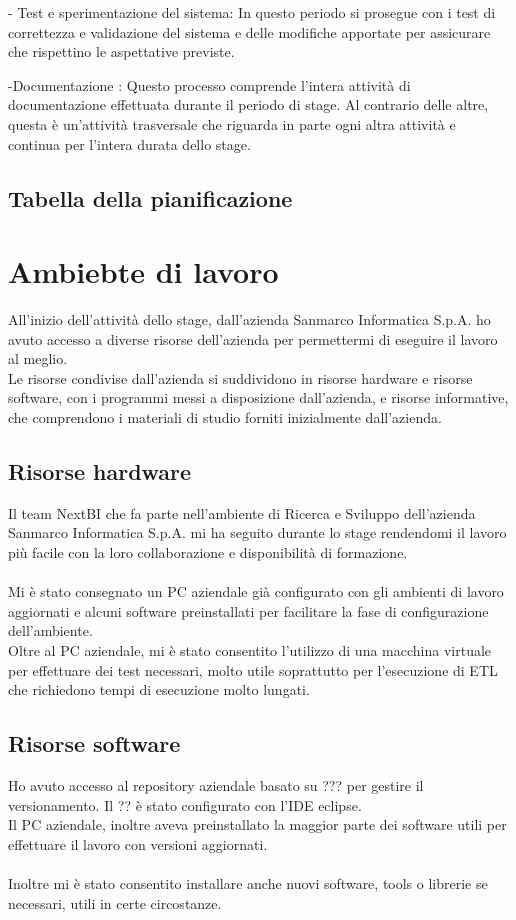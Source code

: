 - Test e sperimentazione del sistema:
In questo periodo si prosegue con i test di correttezza e validazione del sistema e delle modifiche apportate per assicurare che rispettino le aspettative previste.

-Documentazione : 
Questo  processo comprende l’intera attività di documentazione effettuata durante il periodo di stage. Al contrario delle altre, questa è un’attività trasversale che riguarda in parte ogni altra attività e continua per l’intera durata dello stage.


\subsection{Tabella della pianificazione}

\section{Ambiebte di lavoro}

All’inizio dell’attività dello stage, dall’azienda Sanmarco Informatica S.p.A. ho avuto accesso a diverse risorse dell’azienda per permettermi di eseguire il lavoro al meglio. \\
Le risorse condivise dall'azienda si suddividono in risorse hardware e risorse software, con i programmi messi a disposizione dall’azienda, e risorse informative, che comprendono i materiali di studio forniti inizialmente dall’azienda. 

\subsection{Risorse hardware}

Il team NextBI che fa parte nell’ambiente di Ricerca e Sviluppo dell'azienda Sanmarco Informatica S.p.A. mi ha seguito durante lo stage rendendomi il lavoro più facile con la loro collaborazione e disponibilità di formazione. \\\\

Mi è stato consegnato un PC aziendale già configurato con gli ambienti di lavoro aggiornati e alcuni software preinstallati per facilitare la fase di configurazione dell’ambiente. \\
Oltre al PC aziendale, mi è stato consentito l’utilizzo di una macchina virtuale per effettuare dei test necessari, molto utile soprattutto per l’esecuzione di ETL che richiedono tempi di esecuzione molto lungati. 
\subsection{Risorse software}
Ho avuto accesso al repository aziendale basato su ??? per gestire il versionamento. Il ?? è stato configurato con l’IDE eclipse. \\
Il PC aziendale, inoltre aveva preinstallato la maggior parte dei software utili per effettuare il lavoro con versioni aggiornati. \\\\
Inoltre mi è stato consentito installare anche nuovi software, tools o librerie se necessari, utili in certe circostanze.

